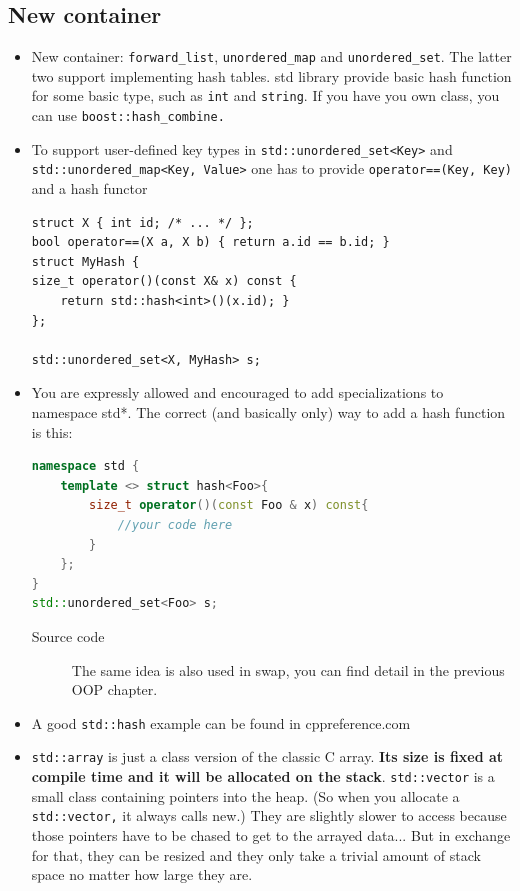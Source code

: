 \documentclass[a4paper,11pt,twoside]{book}
\begin{document}
\subsection{New container}
\begin{itemize}

    \item New container: \texttt{forward\_list}, \texttt{unordered\_map} and \texttt{unordered\_set}.  The latter two support implementing hash tables. std library provide basic hash function for some basic type, such as \texttt{int} and \texttt{string}. If you have you own class, you can use \texttt{boost::hash\_combine.} 

    \item To support user-defined key types in \texttt{std::unordered\_set<Key>} and \texttt{std::unordered\_map<Key, Value>} one has to provide \texttt{operator==(Key, Key)} and a hash functor
\begin{lstlisting}[numbers=none]
struct X { int id; /* ... */ };
bool operator==(X a, X b) { return a.id == b.id; }
struct MyHash {
size_t operator()(const X& x) const { 
	return std::hash<int>()(x.id); }
};

std::unordered_set<X, MyHash> s;
\end{lstlisting}

    \item You are expressly allowed and encouraged to add specializations to namespace std*. The correct (and basically only) way to add a hash function is this:
\begin{lstlisting}[frame=single, language=c++]
namespace std {
	template <> struct hash<Foo>{
		size_t operator()(const Foo & x) const{
			//your code here
		}
	};
}
std::unordered_set<Foo> s;
\end{lstlisting}

\begin{description}
    \item[Source code] The same idea is also used in swap, you can find detail in the previous OOP chapter.
\end{description}
    \item A good \texttt{std::hash} example can be found in cppreference.com 

    \item \texttt{std::array} is just a class version of the classic C array. \textbf{Its size is fixed at compile time and it will be allocated  on the stack}. \texttt{std::vector} is a small class containing pointers into the heap. (So when you allocate a \texttt{std::vector,} it always calls new.) They are slightly slower to access because those pointers have to be chased to get to the arrayed data... But in exchange for that, they can be resized and they only take a trivial amount of stack space no matter how large they are.


\end{itemize}
\end{document}
